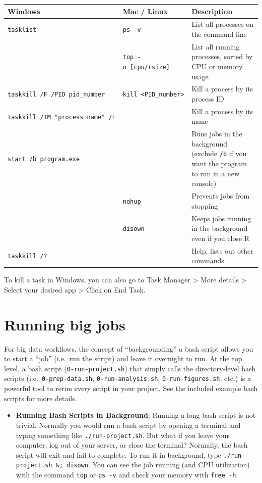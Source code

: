 \documentclass[
]{book}
\providecommand{\tightlist}{%
  \setlength{\itemsep}{0pt}\setlength{\parskip}{0pt}}
\begin{document}
\begin{longtable}[]{@{}
  >{\raggedright\arraybackslash}p{}
  >{\raggedright\arraybackslash}p{}
  >{\raggedright\arraybackslash}p{}@{}}
\toprule
Windows & Mac / Linux & Description \\
\midrule
\endhead
\texttt{tasklist} & \texttt{ps\ -v} & List all processes on the command line \\
& \texttt{top\ -o\ {[}cpu/rsize{]}} & List all running processes, sorted by CPU or memory usage \\
\texttt{taskkill\ /F\ /PID\ pid\_number} & \texttt{kill\ \textless{}PID\_number\textgreater{}} & Kill a process by its process ID \\
\texttt{taskkill\ /IM\ "process\ name"\ /F} & & Kill a process by its name \\
\texttt{start\ /b\ program.exe} & & Runs jobs in the background (exclude \texttt{/b} if you want the program to run in a new console) \\
& \texttt{nohup} & Prevents jobs from stopping \\
& \texttt{disown} & Keeps jobs running in the background even if you close R \\
\texttt{taskkill\ /?} & & Help, lists out other commands \\
\bottomrule
\end{longtable}

To kill a task in Windows, you can also go to Task Manager \textgreater{} More details \textgreater{} Select your desired app \textgreater{} Click on End Task.

\hypertarget{running-big-jobs}{%
\section{Running big jobs}\label{running-big-jobs}}

For big data workflows, the concept of ``backgrounding'' a bash script allows you to start a ``job'' (i.e.~run the script) and leave it overnight to run. At the top level, a bash script (\texttt{0-run-project.sh}) that simply calls the directory-level bash scripts (i.e.~\texttt{0-prep-data.sh}, \texttt{0-run-analysis.sh}, \texttt{0-run-figures.sh}, etc.) is a powerful tool to rerun every script in your project. See the included example bash scripts for more details.

\begin{itemize}
\tightlist
\item
  \textbf{Running Bash Scripts in Background}: Running a long bash script is not trivial. Normally you would run a bash script by opening a terminal and typing something like \texttt{./run-project.sh}. But what if you leave your computer, log out of your server, or close the terminal? Normally, the bash script will exit and fail to complete. To run it in background, type \texttt{./run-project.sh\ \&;\ disown}. You can see the job running (and CPU utilization) with the command \texttt{top} or \texttt{ps\ -v} and check your memory with \texttt{free\ -h}.
\end{itemize}
\end{document}
